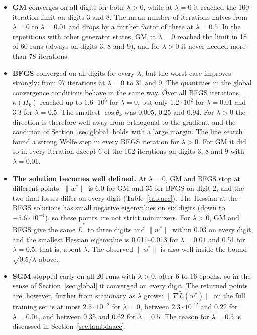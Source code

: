 \begin{itemize}
  \item \textbf{GM} converges on all digits for both $\lambda>0$, while at $\lambda=0$ it reached the 100-iteration limit on digits 3 and 8. The mean number of iterations halves from $\lambda=0$ to $\lambda=0.01$ and drops by a further factor of three at $\lambda=0.5$. In the repetitions with other generator states, GM at $\lambda=0$ reached the limit in 18 of 60 runs (always on digits 3, 8 and 9), and for $\lambda>0$ it never needed more than 78 iterations.
  \item \textbf{BFGS} converged on all digits for every $\lambda$, but the worst case improves strongly: from 97 iterations at $\lambda=0$ to 31 and 9. The quantities in the global convergence conditions behave in the same way. Over all BFGS iterations, $\kappa(H_k)$ reached up to $1.6\cdot10^{6}$ for $\lambda=0$, but only $1.2\cdot10^{2}$ for $\lambda=0.01$ and $3.3$ for $\lambda=0.5$. The smallest $\cos\theta_k$ was $0.005$, $0.25$ and $0.94$. For $\lambda>0$ the direction is therefore well away from orthogonal to the gradient, and the condition of Section~\ref{sec:global} holds with a large margin. The line search found a strong Wolfe step in every BFGS iteration for $\lambda>0$. For GM it did so in every iteration except 6 of the 162 iterations on digits 3, 8 and 9 with $\lambda=0.01$.
  \item \textbf{The solution becomes well defined.} At $\lambda=0$, GM and BFGS stop at different points: $\|w^*\|$ is 6.0 for GM and 35 for BFGS on digit 2, and the two final losses differ on every digit (Table~\ref{tab:acc}). The Hessian at the BFGS solutions has small negative eigenvalues on six digits (down to $-5.6\cdot10^{-4}$), so these points are not strict minimizers. For $\lambda>0$, GM and BFGS give the same $\tilde L^*$ to three digits and $\|w^*\|$ within 0.03 on every digit, and the smallest Hessian eigenvalue is 0.011--0.013 for $\lambda=0.01$ and 0.51 for $\lambda=0.5$, that is, about $\lambda$. The observed $\|w^*\|$ is also well inside the bound $\sqrt{0.5/\lambda}$ above.
  \item \textbf{SGM} stopped early on all 20 runs with $\lambda>0$, after 6 to 16 epochs, so in the sense of Section~\ref{sec:global} it converged on every digit. The returned points are, however, further from stationary as $\lambda$ grows: $\|\nabla\tilde L(w^*)\|$ on the full training set is at most $2.5\cdot10^{-2}$ for $\lambda=0$, between $2.3\cdot10^{-2}$ and $0.22$ for $\lambda=0.01$, and between 0.35 and 0.62 for $\lambda=0.5$. The reason for $\lambda=0.5$ is discussed in Section~\ref{sec:lambdaacc}.
\end{itemize}

